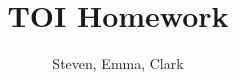 \documentclass[12pt]{article}
\newenvironment{theorem}[2][Theorem]{\begin{trivlist}
\item[\hskip \labelsep {\bfseries #1}\hskip \labelsep {\bfseries #2.}]}{\end{trivlist}}
\newenvironment{lemma}[2][Lemma]{\begin{trivlist}
\item[\hskip \labelsep {\bfseries #1}\hskip \labelsep {\bfseries #2.}]}{\end{trivlist}}
\newenvironment{exercise}[2][Exercise]{\begin{trivlist}
\item[\hskip \labelsep {\bfseries #1}\hskip \labelsep {\bfseries #2.}]}{\end{trivlist}}
\newenvironment{problem}[2][Problem]{\begin{trivlist}
\item[\hskip \labelsep {\bfseries #1}\hskip \labelsep {\bfseries #2.}]}{\end{trivlist}}
\newenvironment{question}[2][Question]{\begin{trivlist}
\item[\hskip \labelsep {\bfseries #1}\hskip \labelsep {\bfseries #2.}]}{\end{trivlist}}
\newenvironment{corollary}[2][Corollary]{\begin{trivlist}
\item[\hskip \labelsep {\bfseries #1}\hskip \labelsep {\bfseries #2.}]}{\end{trivlist}}
\begin{document}
 
 
\title{TOI Homework}%
\author{Steven, Emma, Clark\\ %
}%
\maketitle



 
\end{document}
